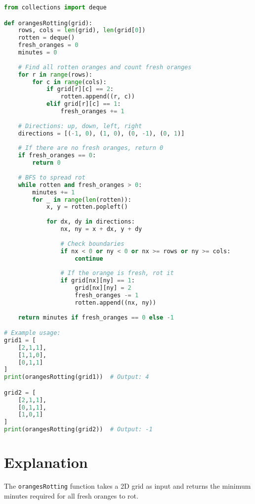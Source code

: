 \begin{fullwidth}
\begin{lstlisting}[language=Python]
from collections import deque

def orangesRotting(grid):
    rows, cols = len(grid), len(grid[0])
    rotten = deque()
    fresh_oranges = 0
    minutes = 0
    
    # Find all rotten oranges and count fresh oranges
    for r in range(rows):
        for c in range(cols):
            if grid[r][c] == 2:
                rotten.append((r, c))
            elif grid[r][c] == 1:
                fresh_oranges += 1
    
    # Directions: up, down, left, right
    directions = [(-1, 0), (1, 0), (0, -1), (0, 1)]
    
    # If there are no fresh oranges, return 0
    if fresh_oranges == 0:
        return 0
    
    # BFS to spread rot
    while rotten and fresh_oranges > 0:
        minutes += 1
        for _ in range(len(rotten)):
            x, y = rotten.popleft()
            
            for dx, dy in directions:
                nx, ny = x + dx, y + dy
                
                # Check boundaries
                if nx < 0 or ny < 0 or nx >= rows or ny >= cols:
                    continue
                
                # If the orange is fresh, rot it
                if grid[nx][ny] == 1:
                    grid[nx][ny] = 2
                    fresh_oranges -= 1
                    rotten.append((nx, ny))
    
    return minutes if fresh_oranges == 0 else -1

# Example usage:
grid1 = [
    [2,1,1],
    [1,1,0],
    [0,1,1]
]
print(orangesRotting(grid1))  # Output: 4

grid2 = [
    [2,1,1],
    [0,1,1],
    [1,0,1]
]
print(orangesRotting(grid2))  # Output: -1
\end{lstlisting}
\end{fullwidth}

\section*{Explanation}

The \texttt{orangesRotting} function takes a 2D grid as input and returns the minimum minutes required for all fresh oranges to rot.

